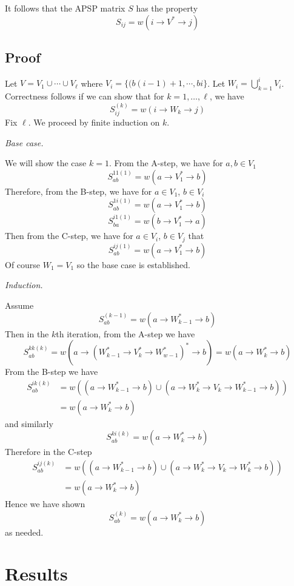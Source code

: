 \documentclass{article} %
\begin{document}
It follows that the APSP matrix $S$ has the property
\[
S_{ij} = w(i \to V^* \to j)
\]

\subsection{Proof}

Let $V = V_1 \cup \cdots \cup V_\ell$ where $V_i = \{(b(i-1) + 1, \cdots, bi\}$.
Let $W_i = \bigcup_{k=1}^i V_i$.
Correctness follows if we can show that for $k = 1,\hdots, \ell$, we have
\[
S^{(k)}_{ij} = w(i \to W_k \to j)
\]
Fix $\ell$. We proceed by finite induction on $k$.

\emph{Base case.}

We will show the case $k = 1$.
From the A-step, we have for $a, b \in V_1$
\[
S^{11(1)}_{ab} = w(a \to V_1^* \to b)
\]
Therefore, from the B-step, we have for $a \in V_1$, $b \in V_i$
\[
S^{1i(1)}_{ab} = w(a \to V_1^* \to b) 
\]
\[
S^{i1(1)}_{ba} = w(b \to V_1^* \to a) 
\]
Then from the C-step, we have for $a \in V_i$, $b \in V_j$ that
\[
S^{ij(1)}_{ab} = w(a \to V_1^* \to b)
\]
Of course $W_1 = V_1$ so the base case is established.

\emph{Induction.}

Assume
\[
S^{(k-1)}_{ab} = w(a \to W_{k-1}^* \to b)
\]
Then in the $k$th iteration, from the A-step we have
\[
S^{kk(k)}_{ab} = w(a \to (W_{k-1}^* \to V_k^* \to W_{w-1}^*)^* \to b) = w(a \to W_k^* \to b)
\]
From the B-step we have
\begin{align*}
S^{ik(k)}_{ab} &= w((a \to W_{k-1}^* \to b) \cup (a \to W_k^* \to V_k \to W_{k-1}^* \to b))\\
&= w(a \to W_k^* \to b)
\end{align*}
and similarly
\[
S^{ki(k)}_{ab} = w(a \to W_k^* \to b)
\]
Therefore in the C-step
\begin{align*}
S^{ij(k)}_{ab} &= w((a \to W_{k-1}^* \to b) \cup (a \to W_k^* \to V_k \to W_k^* \to b))\\
&= w(a \to W_k^* \to b)
\end{align*}
Hence we have shown
\[
S^{(k)}_{ab} = w(a \to W_k^* \to b)
\]
as needed.

\section{Results}
\end{document}
